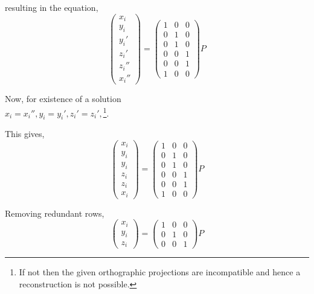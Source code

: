\documentclass[a4paper,11pt,openany]{book}
\begin{document}
resulting in the equation,
\begin{equation}
\left(\begin{array}{c} x_i \\ y_i \\ y_i' \\ z_i' \\ z_i'' \\ x_i'' \end{array}\right) = 
\left(\begin{array}{ccc} 1 & 0 & 0\\ 0 & 1 & 0\\ 0 & 1 & 0\\ 0 & 0 & 1\\ 0 & 0 & 1\\ 1 & 0 & 0 \end{array}\right)P
\end{equation}


Now, for existence of a solution \\
 $x_i = x_i'', y_i = y_i', z_i' = z_i',$\footnote{If not then the given orthographic projections are incompatible and hence a reconstruction is not possible.}.

This gives,
\begin{equation}
\left(\begin{array}{c} x_i \\ y_i \\ y_i \\ z_i \\ z_i \\ x_i \end{array}\right) = 
\left(\begin{array}{ccc} 1 & 0 & 0\\ 0 & 1 & 0\\ 0 & 1 & 0\\ 0 & 0 & 1\\ 0 & 0 & 1\\ 1 & 0 & 0 \end{array}\right)P
\end{equation}


Removing redundant rows,
\begin{equation}
\left(\begin{array}{c} x_i \\ y_i \\ z_i \end{array}\right) = 
\left(\begin{array}{ccc} 1 & 0 & 0\\ 0 & 1 & 0\\ 0 & 0 & 1 \end{array}\right)P
\end{equation}
\end{document}
